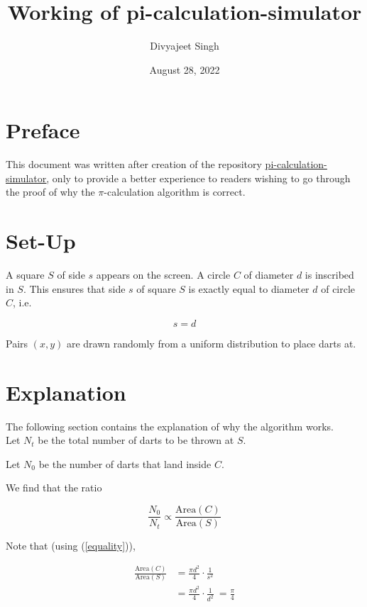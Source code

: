\documentclass{article}
\title{Working of pi-calculation-simulator}
\author{Divyajeet Singh}
\date{August 28, 2022}
\newcommand{\bluelink}[2]{{\color{blue}\underline{\href{#1}{#2}}}}
\begin{document}
\maketitle

\section*{Preface}
This document was written after creation of the repository
\bluelink{https://github.com/divyajeettt/pi-calculation-simulator}{pi-calculation-simulator},
only to provide a better experience to readers wishing
to go through the proof of why the $\pi$-calculation algorithm is correct.

\section*{Set-Up}

A square $S$ of side $s$ appears on the screen. A circle $C$ of diameter $d$ is inscribed in $S$.
This ensures that side $s$ of square $S$ is exactly equal to diameter $d$ of circle $C$, i.e.

\begin{equation}\label{equality} s = d\end{equation}

\noindent Pairs $(x, y)$ are drawn randomly from a uniform distribution to place darts at.

\section*{Explanation}

The following section contains the explanation of why the algorithm works. \\

Let $N_t$ be the total number of darts to be thrown at $S$.

Let $N_0$ be the number of darts that land inside $C$.

We find that the ratio

\begin{equation}
    \frac{N_0}{N_t} \varpropto \frac{\text{Area}(C)}{\text{Area}(S)}
\end{equation}

Note that (using (\ref{equality})),

\begin{equation}\begin{split}
    \label{area}
    \frac{\text{Area}(C)}{\text{Area}(S)} &= \frac{\pi d^2}{4} \cdot \frac{1}{s^2} \\
    &= \frac{\pi d^2}{4} \cdot \frac{1}{d^2}\ = \frac{\pi}{4}
\end{split}\end{equation}
\end{document}
